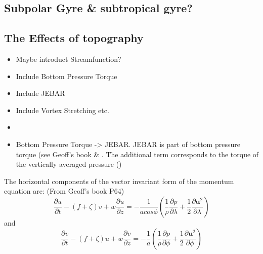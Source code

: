 \documentclass[..\EOYR.tex]{subfiles}
\begin{document}
\subsection{Subpolar Gyre \& subtropical gyre?}

\subsection{The Effects of topography}
\begin{itemize}
    \item Maybe introduct Streamfunction?
    \item Include Bottom Pressure Torque
    \item Include JEBAR
    \item Include Vortex Stretching etc. \citep{Zhang2007}
    \item \citep{Bell1999}
    \item Bottom Pressure Torque -> JEBAR. JEBAR is part of bottom pressure torque (see Geoff's book \& \citep{Greatbatch1991}. The additional term corresponds to the torque of the vertically averaged pressure (\citep{Greatbatch1991})
\end{itemize}

The horizontal components of the vector invariant form of the momentum equation are: (From Geoff's book P64)
\begin{equation}\label{VIMomentumU}
    \frac{\partial u}{\partial t} - (f+\zeta)v + w\frac{\partial u}{\partial z} = -\frac{1}{a cos \phi}(\frac{1}{\rho}\frac{\partial p}{\partial \lambda} + \frac{1}{2}\frac{\partial \boldsymbol{u}^2}{\partial \lambda})
\end{equation}
and
\begin{equation}\label{VIMomentumV}
    \frac{\partial v}{\partial t} - (f+\zeta)u + w\frac{\partial v}{\partial z} = -\frac{1}{a}(\frac{1}{\rho}\frac{\partial p}{\partial \phi} + \frac{1}{2}\frac{\partial \boldsymbol{u}^2}{\partial \phi})
\end{equation}
\end{document}
